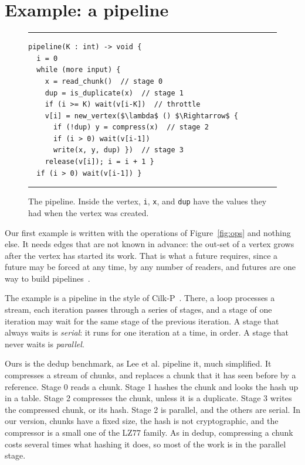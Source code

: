 \documentclass[sigplan,nonacm]{acmart}
\begin{document}
\section{Example: a pipeline}
\label{sec:pipeline}

\begin{figure}
\hrule
\begin{lstlisting}
pipeline(K : int) -> void {
  i = 0
  while (more input) {
    x = read_chunk()  // stage 0
    dup = is_duplicate(x)  // stage 1
    if (i >= K) wait(v[i-K])  // throttle
    v[i] = new_vertex($\lambda$ () $\Rightarrow$ {
      if (!dup) y = compress(x)  // stage 2
      if (i > 0) wait(v[i-1])
      write(x, y, dup) })  // stage 3
    release(v[i]); i = i + 1 }
  if (i > 0) wait(v[i-1]) }
\end{lstlisting}
\hrule
\caption{The pipeline.  Inside the vertex, \lstinline|i|,
  \lstinline|x|, and \lstinline|dup| have the values they had when the
  vertex was created.}
\label{fig:pipeline}
\end{figure}

Our first example is written with the operations of
Figure~\ref{fig:ops} and nothing else.
%
It needs edges that are not known in advance: the out-set of a vertex
grows after the vertex has started its work.
%
That is what a future requires, since a future may be forced at any
time, by any number of readers, and futures are one way to build
pipelines~\cite{blelloch1997pipelining}.

The example is a pipeline in the style of Cilk-P~\cite{lee2013piper}.
%
There, a loop processes a stream, each iteration passes through a
series of stages, and a stage of one iteration may wait for the same
stage of the previous iteration.
%
A stage that always waits is \emph{serial}: it runs for one iteration
at a time, in order.
%
A stage that never waits is \emph{parallel}.

Ours is the dedup benchmark, as Lee et al. pipeline it, much
simplified.
%
It compresses a stream of chunks, and replaces a chunk that it has
seen before by a reference.
%
Stage 0 reads a chunk.
%
Stage 1 hashes the chunk and looks the hash up in a table.
%
Stage 2 compresses the chunk, unless it is a duplicate.
%
Stage 3 writes the compressed chunk, or its hash.
%
Stage 2 is parallel, and the others are serial.
%
In our version, chunks have a fixed size, the hash is not
cryptographic, and the compressor is a small one of the LZ77 family.
%
As in dedup, compressing a chunk costs several times what hashing it
does, so most of the work is in the parallel stage.
\end{document}
